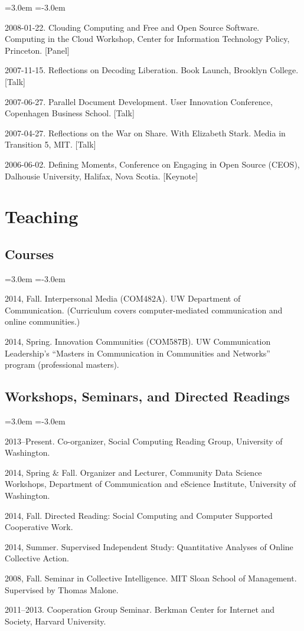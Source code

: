 \documentclass[10pt]{article}
\newenvironment{cvlist}{
\begin{list}{}{\leftmargin=3.0em \itemindent=-3.0em}
  \setlength{\itemsep}{0pt}
  \setlength{\parskip}{0em}
  \setlength{\parsep}{1em}
  \setlength{\parindent}{0em}}
{\vspace{1em}
\end{list}}
\begin{document}
\begin{cvlist}
\item 2008-01-22. Clouding Computing and Free and Open Source Software. Computing in the Cloud Workshop, Center for Information Technology Policy, Princeton. [Panel]
\item 2007-11-15. Reflections on Decoding Liberation. Book Launch, Brooklyn College. [Talk]
\item 2007-06-27. Parallel Document Development. User Innovation Conference, Copenhagen Business School. [Talk]
\item 2007-04-27. Reflections on the War on Share. With Elizabeth Stark. Media in Transition 5, MIT. [Talk]
\item 2006-06-02. Defining Moments, Conference on Engaging in Open Source (CEOS), Dalhousie University, Halifax, Nova Scotia. [Keynote]
\end{cvlist}

\section{Teaching}

\subsection{Courses}
\begin{cvlist}
\item 2014, Fall. Interpersonal Media (COM482A). UW Department of Communication. (Curriculum covers computer-mediated communication and online communities.) %
\item 2014, Spring. Innovation Communities (COM587B). UW Communication Leadership's ``Masters in Communication in Communities and Networks'' program (professional masters). 
\end{cvlist}

\subsection{Workshops, Seminars, and Directed Readings}
\begin{cvlist}
\item 2013--Present. Co-organizer, Social Computing Reading Group, University of Washington.
\item 2014, Spring \& Fall. Organizer and Lecturer, Community Data Science Workshops, Department of Communication and eScience Institute, University of Washington.
\item 2014, Fall. Directed Reading: Social Computing and Computer Supported Cooperative Work. %
\item 2014, Summer. Supervised Independent Study: Quantitative Analyses of Online Collective Action. %
\item 2008, Fall. Seminar in Collective Intelligence. MIT Sloan School of Management. Supervised by Thomas Malone.
\item 2011--2013. Cooperation Group Seminar. Berkman Center for Internet and Society, Harvard University.
\end{cvlist}
\end{document}
